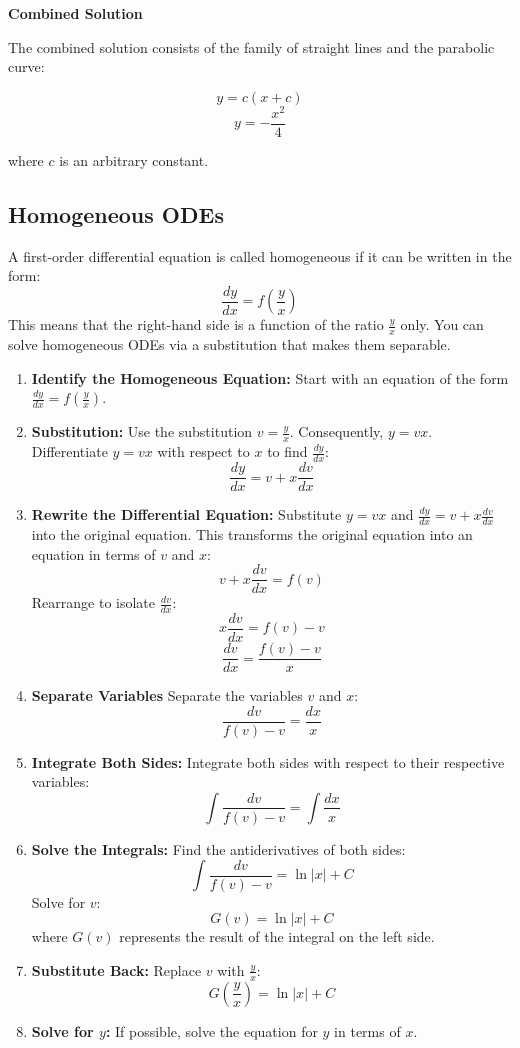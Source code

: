 \documentclass[12pt]{article}
\begin{document}
\textbf{Combined Solution}

The combined solution consists of the family of straight lines and the parabolic curve:

\[ y = c(x + c) \]
\[ y = -\frac{x^2}{4} \]

where \( c \) is an arbitrary constant.

\subsection{Homogeneous ODEs}

A first-order differential equation is called homogeneous if it can be written in the form:
\[ \frac{dy}{dx} = f\left(\frac{y}{x}\right) \]
This means that the right-hand side is a function of the ratio \( \frac{y}{x} \) only. You can solve homogeneous ODEs via a substitution that makes them separable.

\begin{enumerate}
\item \textbf{Identify the Homogeneous Equation:}
   Start with an equation of the form \( \frac{dy}{dx} = f\left(\frac{y}{x}\right) \).

\item \textbf{Substitution:}
   Use the substitution \( v = \frac{y}{x} \). Consequently, \( y = vx \).
   Differentiate \( y = vx \) with respect to \( x \) to find \( \frac{dy}{dx} \):
   \[ \frac{dy}{dx} = v + x \frac{dv}{dx} \]

\item \textbf{Rewrite the Differential Equation:}
   Substitute \( y = vx \) and \( \frac{dy}{dx} = v + x \frac{dv}{dx} \) into the original equation. This transforms the original equation into an equation in terms of \( v \) and \( x \):
   \[ v + x \frac{dv}{dx} = f(v) \]
   Rearrange to isolate \( \frac{dv}{dx} \):
   \[ x \frac{dv}{dx} = f(v) - v \]
   \[ \frac{dv}{dx} = \frac{f(v) - v}{x} \]

\item \textbf{Separate Variables}
   Separate the variables \( v \) and \( x \):
   \[ \frac{dv}{f(v) - v} = \frac{dx}{x} \]

\item \textbf{Integrate Both Sides:}
   Integrate both sides with respect to their respective variables:
   \[ \int \frac{dv}{f(v) - v} = \int \frac{dx}{x} \]

\item \textbf{Solve the Integrals:}
   Find the antiderivatives of both sides:
   \[ \int \frac{dv}{f(v) - v} = \ln|x| + C \]
   Solve for \( v \):
   \[ G(v) = \ln|x| + C \]
   where \( G(v) \) represents the result of the integral on the left side.

\item \textbf{Substitute Back:}
   Replace \( v \) with \( \frac{y}{x} \):
   \[ G\left(\frac{y}{x}\right) = \ln|x| + C \]

\item \textbf{Solve for \( y \):}
   If possible, solve the equation for \( y \) in terms of \( x \).
\end{enumerate}
\end{document}
